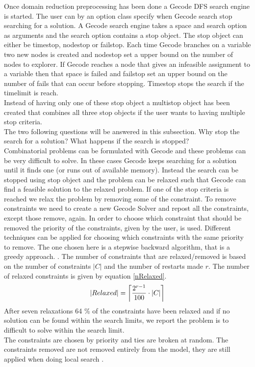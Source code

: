 Once domain reduction preprocessing has been done a Gecode DFS search engine is started. The user can by an option 
class specify when Gecode search stop searching for a solution. A Gecode search engine takes a space and search option 
as arguments and the search option contains a stop object. The stop object can either be timestop, nodestop or 
failstop. Each time Gecode branches on a variable two new nodes is created and nodestop set a upper bound on the number 
of nodes to explorer. If Gecode reaches a node that gives an infeasible assignment to a variable then that space is 
failed and failstop set an upper bound on the number of fails that can occur before stopping. Timestop stops the search 
if the timelimit is reach. \\ 
Instead of having only one of these stop object a multistop object has been created that combines all three stop 
objects if the user wants to having multiple stop criteria. \\ 
The two following questions will be answered in this subsection. Why stop the search for a solution? What happens if the 
search is stopped? \\ 
Combinatorial problems can be formulated with Gecode and these problems can be very difficult to solve. In these cases 
Gecode keeps searching for a solution until it finds one (or runs out of available memory). Instead the search can be 
stopped using stop object and the problem can be relaxed such that Gecode can find a feasible solution to the relaxed 
problem. If one of the stop criteria is reached we relax the problem by removing some of the constraint. To remove 
constraints we need to create a new Gecode Solver and repost all the constraints, except those remove, again. In order 
to choose which constraint that should be removed the priority of the constraints, given by the user, is used. 
Different techniques can be applied for choosing which constraints with the same priority to remove. The 
one chosen here is a stepwise backward algorithm, that is a greedy approach. . The number of constraints that are relaxed/removed is based 
on the number of constraints $|C|$ and the number of restarts made $r$. The number of relaxed constraints is given by 
equation \ref{nRelaxed}. 
\begin{equation}
 |Relaxed| = \ceil[\bigg]{\frac{2^{r-1}}{100}\cdot |C|}
 \label{nRelaxed}
\end{equation} 
After seven relaxations 64 \% of the constraints have been relaxed and if no solution can be found within the search 
limits, we report the problem is to difficult to solve within the search limit. \\ 
The constraints are chosen by priority and ties are broken at random. The constraints removed are not removed entirely 
from the model, they are still applied when doing local search . 